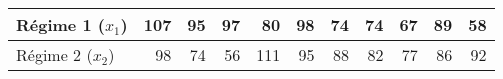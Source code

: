 \documentclass{standalone}
\begin{document}
\begin{tabular}{l|rrrrrrrrrr}
	R\'egime 1 ($x_1$) & 107 & 95 & 97 & 80 & 98 & 74 & 74 & 67 & 89 &
	58\\ 
	\hline 
	R\'egime 2 ($x_2$) & 98 & 74 & 56 & 111 & 95 & 88 & 82 & 77 & 86 & 92\\
\end{tabular}
\end{document}
